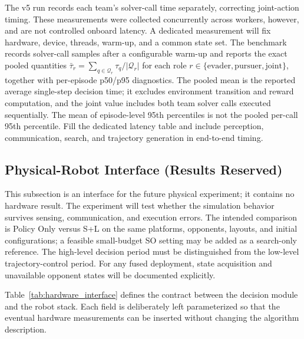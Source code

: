 \documentclass[letterpaper,10pt,conference]{ieeeconf}
\newif\ifshowhardware
\begin{document}
The v5 run records each team's solver-call time separately, correcting
joint-action timing. These measurements were collected concurrently
across workers, however, and are not controlled onboard latency.
A dedicated measurement will fix hardware, device, threads, warm-up,
and a common state set. The benchmark records solver-call samples after
a configurable warm-up and reports the exact pooled quantities
$\bar\tau_r=\sum_{q\in\mathcal Q_r}\tau_q/|\mathcal Q_r|$ for each
role $r\in\{\mathrm{evader},\mathrm{pursuer},\mathrm{joint}\}$,
together with per-episode p50/p95 diagnostics. The pooled mean is the
reported average single-step decision time; it excludes environment
transition and reward computation, and the joint value includes both
team solver calls executed sequentially. The mean of episode-level 95th
percentiles is not the pooled per-call 95th percentile.
Fill the dedicated latency table and include perception,
communication, search, and trajectory generation in end-to-end timing.

\ifshowhardware
\subsection{Physical-Robot Interface (Results Reserved)}

This subsection is an interface for the future physical experiment; it
contains no hardware result. The experiment will test whether the
simulation behavior survives sensing, communication, and execution
errors. The intended comparison is Policy Only versus S+L on the same
platforms, opponents, layouts, and initial configurations; a feasible
small-budget SO setting may be added as a search-only reference. The
high-level decision period must be distinguished from the low-level
trajectory-control period. For any fused deployment, state acquisition
and unavailable opponent states will be documented explicitly.

Table~\ref{tab:hardware_interface} defines the contract between the
decision module and the robot stack. Each field is deliberately left
parameterized so that the eventual hardware measurements can be inserted
without changing the algorithm description.
\end{document}
